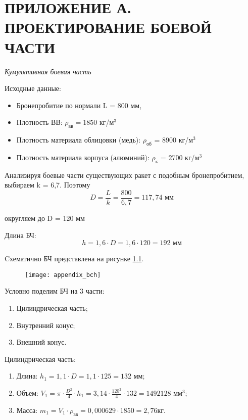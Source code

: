 \chapter{ПРИЛОЖЕНИЕ А. \\ ПРОЕКТИРОВАНИЕ БОЕВОЙ ЧАСТИ}
\label{cha:appendix_bch}
\emph{Кумулятивная боевая часть}

Исходные данные:
\begin{itemize}
	\item Бронепробитие по нормали 				L = 800 мм,
	\item Плотность ВВ:							$\rho_\text{вв} = 1850$ кг/$\text{м}^3$
	\item Плотность материала облицовки (медь):			$\rho_\text{об}$ = 8900 кг/$\text{м}^3$
	\item Плотность материала корпуса (алюминий):		$\rho_\text{к}$ = 2700 кг/$\text{м}^3$
\end{itemize}

Анализируя боевые части существующих ракет с подобным бронепробитием, выбираем k = 6,7. Поэтому 
$$ D=\frac{L}{k}=\frac{800}{6,7}=117,74 \text{ мм}$$

округляем до D = 120 мм

Длина БЧ:		$$ h=1,6 \cdot D=1,6 \cdot 120=192 \text{ мм}$$

Cхематично БЧ представлена на рисунке \ref{fig:appendix_bch}.
\begin{figure}
	\begin{center}
		\texttt{[image: appendix\_bch]}
		\caption{}
		\label{fig:appendix_bch}
	\end{center}
\end{figure}

\clearpage
Условно поделим БЧ на 3 части:
\begin{enumerate}
	\item Цилиндрическая часть;
	\item Внутренний конус;
	\item Внешний конус.
\end{enumerate}

Цилиндрическая часть: 
\begin{enumerate}
	\item Длина: 	$h_1=1,1 \cdot D=1,1 \cdot 125 =132$ мм;
	\item Объем: 	$V_1=\pi \cdot \frac{D^2}{4} \cdot h_1=3,14 \cdot \frac{120^2}{4} \cdot 132 = 1492128 \text{ мм}^3 $;
	\item Масса:	$m_1=V_1 \cdot \rho_\text{вв}=0,000629 \cdot 1850=2,76 кг$.
\end{enumerate}


